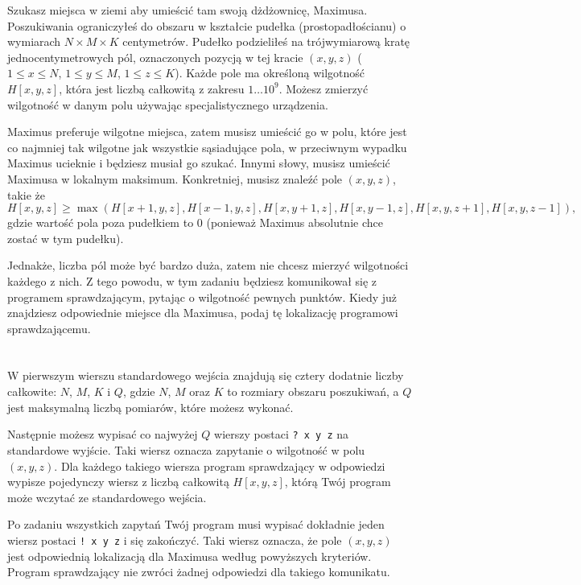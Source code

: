 \ifx\boi\undefined\fi
\def\version{jury-1}

Szukasz miejsca w ziemi aby umieścić tam swoją dżdżownicę, Maximusa. Poszukiwania ograniczyłeś do obszaru w kształcie pudełka (prostopadłościanu)
o wymiarach $N \times M \times K$ centymetrów. Pudełko podzieliłeś na trójwymiarową kratę jednocentymetrowych pól, oznaczonych
pozycją w tej kracie $(x,y,z)$ ($1 \le x \le N$, $1 \le y \le M$, $1 \le z \le K$). Każde pole ma określoną wilgotność $H[x,y,z]$, która jest liczbą całkowitą
z zakresu $1 \dots 10^9$. Możesz zmierzyć wilgotność w danym polu używając specjalistycznego urządzenia.

Maximus preferuje wilgotne miejsca, zatem musisz umieścić go w polu, które jest co najmniej tak wilgotne jak wszystkie sąsiadujące pola, w przeciwnym wypadku Maximus ucieknie i będziesz musiał go szukać.
Innymi słowy, musisz umieścić Maximusa w lokalnym maksimum.
Konkretniej, musisz znaleźć pole $(x,y,z)$, takie że
$$
H[x,y,z] \ge \max(H[x+1,y,z], H[x-1,y,z], H[x,y+1,z], H[x,y-1,z], H[x,y,z+1], H[x,y,z-1]),
$$
gdzie wartość pola poza pudełkiem to $0$ (ponieważ Maximus absolutnie chce zostać w tym pudełku).

Jednakże, liczba pól może być bardzo duża, zatem nie chcesz mierzyć wilgotności każdego z nich. Z tego powodu, w tym zadaniu będziesz komunikował
się z programem sprawdzającym, pytając o wilgotność pewnych punktów. Kiedy już znajdziesz odpowiednie miejsce dla Maximusa, podaj tę lokalizację
programowi sprawdzającemu.

\section*{\interactivity}
W pierwszym wierszu standardowego wejścia znajdują się cztery dodatnie liczby całkowite: $N$, $M$, $K$ i $Q$, gdzie $N$, $M$ oraz $K$ to rozmiary obszaru poszukiwań, a $Q$ jest maksymalną liczbą pomiarów, które możesz wykonać.

Następnie możesz wypisać co najwyżej $Q$ wierszy postaci \texttt{?\ x y z} na standardowe wyjście.
Taki wiersz oznacza zapytanie o wilgotność w polu $(x, y, z)$.
Dla każdego takiego wiersza program sprawdzający w odpowiedzi wypisze pojedynczy wiersz z liczbą całkowitą $H[x,y,z]$, 
którą Twój program może wczytać ze standardowego wejścia.

Po zadaniu wszystkich zapytań Twój program musi wypisać dokładnie jeden wiersz postaci \texttt{!\ x y z} i się zakończyć.
Taki wiersz oznacza, że pole $(x, y, z)$ jest odpowiednią lokalizacją dla Maximusa według powyższych kryteriów.
Program sprawdzający nie zwróci żadnej odpowiedzi dla takiego komunikatu.

